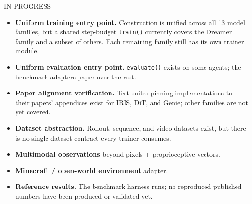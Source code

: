 \documentclass[10pt,a4paper]{article}
\begin{document}
\begin{minipage}[t]{0.325\textwidth}
\begin{tcolorbox}[enhanced,colback=ambersoft!55,colframe=amber!35,boxrule=0.6pt,arc=2pt,
  left=3mm,right=3mm,top=2.5mm,bottom=2.5mm,height=97mm]
{\displayfont\color{amber}\footnotesize IN PROGRESS}\par\vspace{2mm}
{\scriptsize
\begin{itemize}[label=\textcolor{amber}{\scriptsize$\bullet$},leftmargin=3.2mm]
  \item \textbf{Uniform training entry point.} Construction is unified across all 13 model families, but a shared step-budget \texttt{train()} currently covers the Dreamer family and a subset of others. Each remaining family still has its own trainer module.
  \item \textbf{Uniform evaluation entry point.} \texttt{evaluate()} exists on some agents; the benchmark adapters paper over the rest.
  \item \textbf{Paper-alignment verification.} Test suites pinning implementations to their papers' appendices exist for IRIS, DiT, and Genie; other families are not yet covered.
  \item \textbf{Dataset abstraction.} Rollout, sequence, and video datasets exist, but there is no single dataset contract every trainer consumes.
  \item \textbf{Multimodal observations} beyond pixels + proprioceptive vectors.
  \item \textbf{Minecraft / open-world environment} adapter.
  \item \textbf{Reference results.} The benchmark harness runs; no reproduced published numbers have been produced or validated yet.
\end{itemize}}
\end{tcolorbox}
\end{minipage}\hfill
\end{document}
